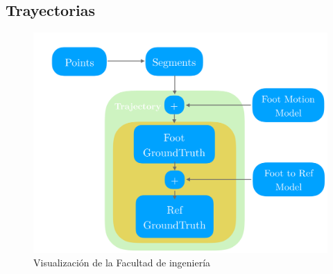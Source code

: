 \subsection{Trayectorias}
\begin{figure}
    \includegraphics[width=1.0\columnwidth]{img/Design/2.pdf}
    \caption[]{Visualización de la Facultad de ingeniería}
\end{figure}

